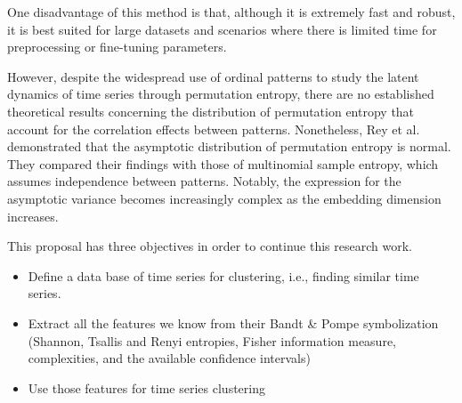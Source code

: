 		
One disadvantage of this method is that, although it is extremely fast and robust, it is best suited for large datasets and scenarios where there is limited time for preprocessing or fine-tuning parameters.

However, despite the widespread use of ordinal patterns to study the latent dynamics of time series through permutation entropy, there are no established theoretical results concerning the distribution of permutation entropy that account for the correlation effects between patterns. Nonetheless, Rey et al. \cite{Rey2023a} demonstrated that the asymptotic distribution of permutation entropy is normal. They compared their findings with those of multinomial sample entropy, which assumes independence between patterns. Notably, the expression for the asymptotic variance becomes increasingly complex as the embedding dimension increases. 

This proposal has three objectives in order to continue this research work.
\begin{itemize}
	\item Define a data base of time series for clustering, i.e., finding similar time series. 
	\item Extract all the features we know from their Bandt \& Pompe symbolization (Shannon, Tsallis and Renyi entropies, Fisher information measure, complexities, and the available confidence intervals)
	\item Use those features for time series clustering 
\end{itemize} 




